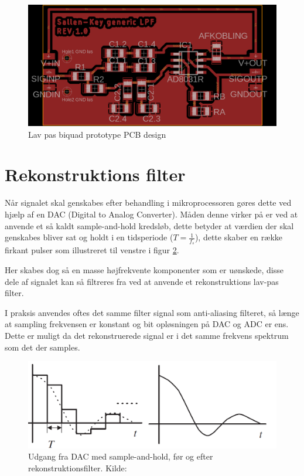 \begin{figure}[H]
	\includegraphics[width=\linewidth]{billeder/skbiquadpcb}
	\caption{Lav pas biquad prototype PCB design}
	\label{fig:skbiquadpcb}
\end{figure}

\section{Rekonstruktions filter}

Når signalet skal genskabes efter behandling i mikroprocessoren gøres dette ved hjælp af en DAC (Digital to Analog Converter). 
Måden denne virker på er ved at anvende et så kaldt sample-and-hold kredsløb,
dette betyder at værdien der skal genskabes bliver sat og holdt i en
tidsperiode ($T=\frac{1}{f_s}$), dette skaber en række firkant pulser som
illustreret til venstre i figur \ref{fig:samplholdrecon}.

Her skabes dog så en masse højfrekvente komponenter som er uønskede, disse dele af signalet kan så filtreres fra ved at anvende et rekonstruktions lav-pas filter.

I praksis anvendes oftes det samme filter signal som anti-aliasing filteret,
så længe at sampling frekvensen er konstant og bit opløsningen på DAC og ADC
er ens. Dette er muligt da det rekonstruerede signal er i det samme frekvens spektrum som det der samples.

\begin{figure}[H]
	\includegraphics[width=\linewidth]{billeder/dacrecon}
	\caption{Udgang fra DAC med sample-and-hold, før og efter rekonstruktionsfilter. Kilde:\cite{Tan2013}}
	\label{fig:samplholdrecon}
\end{figure}
